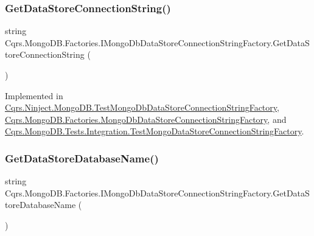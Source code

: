 \subsubsection{\texorpdfstring{Get\+Data\+Store\+Connection\+String()}{GetDataStoreConnectionString()}}
{\footnotesize\ttfamily string Cqrs.\+Mongo\+D\+B.\+Factories.\+I\+Mongo\+Db\+Data\+Store\+Connection\+String\+Factory.\+Get\+Data\+Store\+Connection\+String (\begin{DoxyParamCaption}{ }\end{DoxyParamCaption})}



Implemented in \hyperlink{classCqrs_1_1Ninject_1_1MongoDB_1_1TestMongoDbDataStoreConnectionStringFactory_abc9f81219c65af4182635cd545282b65}{Cqrs.\+Ninject.\+Mongo\+D\+B.\+Test\+Mongo\+Db\+Data\+Store\+Connection\+String\+Factory}, \hyperlink{classCqrs_1_1MongoDB_1_1Factories_1_1MongoDbDataStoreConnectionStringFactory_a76986fcc9521c87bfbb6e417ef13cd53}{Cqrs.\+Mongo\+D\+B.\+Factories.\+Mongo\+Db\+Data\+Store\+Connection\+String\+Factory}, and \hyperlink{classCqrs_1_1MongoDB_1_1Tests_1_1Integration_1_1TestMongoDataStoreConnectionStringFactory_a520a0722aa91ed6144e4e86213ea13da}{Cqrs.\+Mongo\+D\+B.\+Tests.\+Integration.\+Test\+Mongo\+Data\+Store\+Connection\+String\+Factory}.

\mbox{\label{interfaceCqrs_1_1MongoDB_1_1Factories_1_1IMongoDbDataStoreConnectionStringFactory_aca9921fae4214a9eb22a221825c57363}} 
\subsubsection{\texorpdfstring{Get\+Data\+Store\+Database\+Name()}{GetDataStoreDatabaseName()}}
{\footnotesize\ttfamily string Cqrs.\+Mongo\+D\+B.\+Factories.\+I\+Mongo\+Db\+Data\+Store\+Connection\+String\+Factory.\+Get\+Data\+Store\+Database\+Name (\begin{DoxyParamCaption}{ }\end{DoxyParamCaption})}



